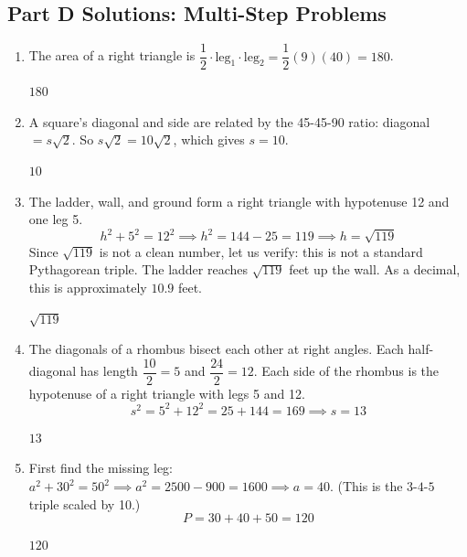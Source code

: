 \documentclass[14pt]{extarticle}
\begin{document}
\subsection*{Part D Solutions: Multi-Step Problems}
\begin{enumerate}
  \item The area of a right triangle is \(\dfrac{1}{2} \cdot \text{leg}_1 \cdot \text{leg}_2 = \dfrac{1}{2}(9)(40) = 180\).

  \(\boxed{180}\)

  \item A square's diagonal and side are related by the 45-45-90 ratio: diagonal \(= s\sqrt{2}\). So \(s\sqrt{2} = 10\sqrt{2}\), which gives \(s = 10\).

  \(\boxed{10}\)

  \item The ladder, wall, and ground form a right triangle with hypotenuse 12 and one leg 5.
  \[
  h^2 + 5^2 = 12^2 \implies h^2 = 144 - 25 = 119 \implies h = \sqrt{119}
  \]
  Since \(\sqrt{119}\) is not a clean number, let us verify: this is not a standard Pythagorean triple. The ladder reaches \(\sqrt{119}\) feet up the wall. As a decimal, this is approximately \(10.9\) feet.

  \(\boxed{\sqrt{119}}\)

  \item The diagonals of a rhombus bisect each other at right angles. Each half-diagonal has length \(\dfrac{10}{2} = 5\) and \(\dfrac{24}{2} = 12\). Each side of the rhombus is the hypotenuse of a right triangle with legs 5 and 12.
  \[
  s^2 = 5^2 + 12^2 = 25 + 144 = 169 \implies s = 13
  \]

  \(\boxed{13}\)

  \item First find the missing leg: \(a^2 + 30^2 = 50^2 \implies a^2 = 2500 - 900 = 1600 \implies a = 40\). (This is the \(3\text{-}4\text{-}5\) triple scaled by 10.)
  \[
  P = 30 + 40 + 50 = 120
  \]

  \(\boxed{120}\)
\end{enumerate}
\end{document}
